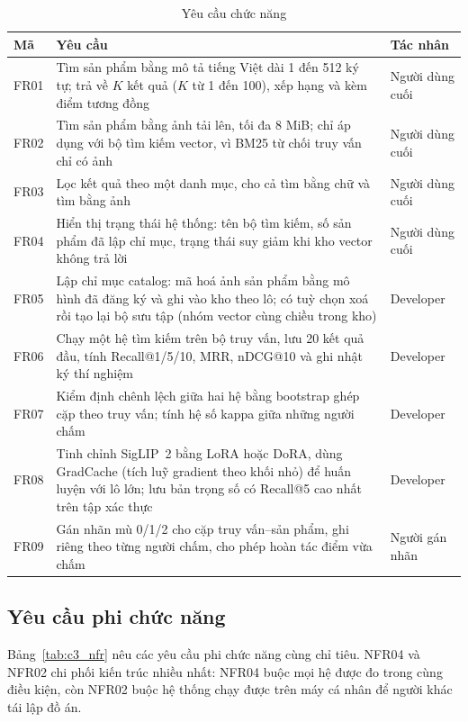 \begin{table}[!htbp]
\centering
\caption{Yêu cầu chức năng}
\label{tab:c3_fr}
\footnotesize
\renewcommand{\arraystretch}{1.0}
\begin{tabularx}{\textwidth}{@{}p{1.2cm} >{\raggedright\arraybackslash}X p{2.6cm}@{}}
\toprule
\textbf{Mã} & \textbf{Yêu cầu} & \textbf{Tác nhân} \\
\midrule
FR01 & Tìm sản phẩm bằng mô tả tiếng Việt dài 1 đến 512 ký tự; trả về $K$ kết quả ($K$ từ 1 đến 100), xếp hạng và kèm điểm tương đồng & Người dùng cuối \\
FR02 & Tìm sản phẩm bằng ảnh tải lên, tối đa 8 MiB; chỉ áp dụng với bộ tìm kiếm vector, vì BM25 từ chối truy vấn chỉ có ảnh & Người dùng cuối \\
FR03 & Lọc kết quả theo một danh mục, cho cả tìm bằng chữ và tìm bằng ảnh & Người dùng cuối \\
FR04 & Hiển thị trạng thái hệ thống: tên bộ tìm kiếm, số sản phẩm đã lập chỉ mục, trạng thái suy giảm khi kho vector không trả lời & Người dùng cuối \\
FR05 & Lập chỉ mục catalog: mã hoá ảnh sản phẩm bằng mô hình đã đăng ký và ghi vào kho theo lô; có tuỳ chọn xoá rồi tạo lại bộ sưu tập (nhóm vector cùng chiều trong kho) & Developer \\
FR06 & Chạy một hệ tìm kiếm trên bộ truy vấn, lưu 20 kết quả đầu, tính Recall@1/5/10, MRR, nDCG@10 và ghi nhật ký thí nghiệm & Developer \\
FR07 & Kiểm định chênh lệch giữa hai hệ bằng bootstrap ghép cặp theo truy vấn; tính hệ số kappa giữa những người chấm & Developer \\
FR08 & Tinh chỉnh SigLIP~2 bằng LoRA hoặc DoRA, dùng GradCache (tích luỹ gradient theo khối nhỏ) để huấn luyện với lô lớn; lưu bản trọng số có Recall@5 cao nhất trên tập xác thực & Developer \\
FR09 & Gán nhãn mù 0/1/2 cho cặp truy vấn--sản phẩm, ghi riêng theo từng người chấm, cho phép hoàn tác điểm vừa chấm & Người gán nhãn \\
\bottomrule
\end{tabularx}
\end{table}

\subsection{Yêu cầu phi chức năng}

Bảng~\ref{tab:c3_nfr} nêu các yêu cầu phi chức năng cùng chỉ tiêu. NFR04 và NFR02 chi phối kiến trúc nhiều nhất: NFR04 buộc mọi hệ được đo trong cùng điều kiện, còn NFR02 buộc hệ thống chạy được trên máy cá nhân để người khác tái lập đồ án.

